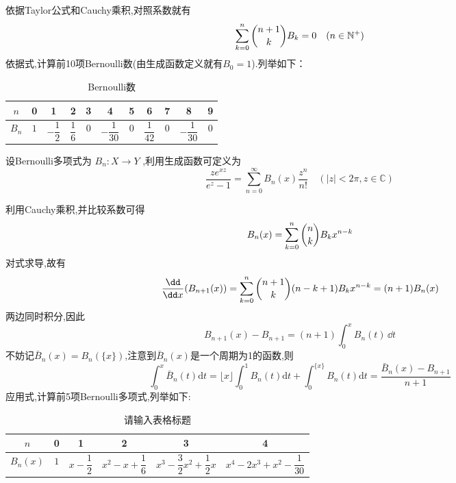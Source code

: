 依据Taylor公式和Cauchy乘积,对照系数就有
\begin{equation}
    \sum_{k=0}^{n}\dbinom{n+1}{k}B_{k}=0\quad(n\in{\mathbb N^{+}})
\end{equation}
依据式,计算前10项Bernoulli数(由生成函数定义就有$B_{0}=1$).列举如下：
\begin{table}[ht]
\centering
\caption{Bernoulli数}
\begin{tabular}{|c|c|c|c|c|c|c|c|c|c|c|}
\hline
$ n $ & 0 & 1 & 2 & 3 & 4 & 5 & 6 & 7 & 8 & 9\\ 
\hline
$ B_{n} $ & $1$ & $-\dfrac{1}{2}$ & $ \dfrac{1}{6}$ & $0$ & $-\dfrac{1}{30}$ & $0$ & $\dfrac{1}{42}$ & $0$ & $-\dfrac{1}{30}$ & $0$\\
\hline
\end{tabular}
\end{table}

\begin{definition}{}
设Bernoulli多项式为 $B_{n}:X\to Y$ ,利用生成函数可定义为
\begin{equation}{}
    \frac{ze^{xz}}{e^{z}-1}=\sum_{n=0}^{\infty}B_{n}(x)\frac{z^{n}}{n!}
    \quad(|z|<2\pi,z\in{\mathbb C})
\end{equation}	
\end{definition}
利用Cauchy乘积,并比较系数可得
\begin{equation}
    B_{n}(x)=\sum_{k=0}^{n}\dbinom{n}{k}B_{k}x^{n-k}
\end{equation}
对式求导,故有
\begin{equation}
    \frac{\dd}{\dd x}(B_{n+1}(x))=\sum_{k=0}^{n}\dbinom{n+1}{k}(n-k+1)B_{k}x^{n-k}=(n+1)B_{n}(x)
\end{equation}
两边同时积分,因此
\begin{equation}
    B_{n+1}(x)-B_{n+1}=(n+1)\int_{0}^{x}B_{n}(t)\,\dd t
\end{equation}
不妨记$\bar{B}_{n}(x)=B_{n}(\{x\})$,注意到$\bar{B}_{n}(x)$是一个周期为1的函数,则
\begin{equation}\label{EMSum_eq13}
    \int_{0}^{x}\bar{B}_{n}(t)\mathrm{d}t
    =\lfloor x\rfloor\int_{0}^{1}B_{n}(t)\mathrm{d}t+\int_{0}^{\{x\}}B_{n}(t)\mathrm{d}t
    =\frac{\bar{B}_{n}(x)-B_{n+1}}{n+1}
\end{equation}
应用式,计算前5项Bernoulli多项式,列举如下:
\begin{table}[ht]
\centering
\caption{请输入表格标题}
\begin{tabular}{|c|c|c|c|c|c|}
\hline
$n$ & 0 & 1 & 2 & 3 & 4\\
\hline
$B_{n}(x)$ & $1$ & $x-\dfrac{1}{2}$ & $x^{2}-x+\dfrac{1}{6}$ & $x^{3}-\dfrac{3}{2}x^{2}+\dfrac{1}{2}x$ & $x^{4}-2x^{3}+x^{2}-\dfrac{1}{30}$\\
\hline
\end{tabular}
\end{table}

